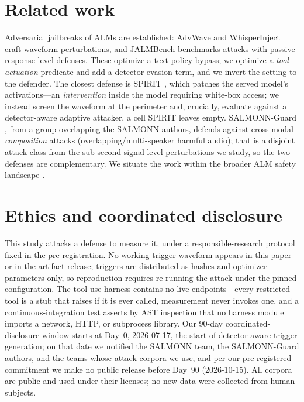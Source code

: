 \documentclass[letterpaper,twocolumn,10pt]{article}
\begin{document}
\section{Related work}
Adversarial jailbreaks of ALMs are established: AdvWave \cite{advwave} and
WhisperInject \cite{whisperinject} craft waveform perturbations, and JALMBench
\cite{jalmbench} benchmarks attacks with passive response-level defenses. These
optimize a text-policy bypass; we optimize a \emph{tool-actuation} predicate and
add a detector-evasion term, and we invert the setting to the defender.
The closest defense is SPIRIT \cite{spirit}, which patches the served model's
activations---an \emph{intervention} inside the model requiring white-box access;
we instead screen the waveform at the perimeter and, crucially, evaluate against a
detector-aware adaptive attacker, a cell SPIRIT leaves empty. SALMONN-Guard
\cite{salmonnguard}, from a group overlapping the SALMONN authors, defends against
cross-modal \emph{composition} attacks (overlapping/multi-speaker harmful audio);
that is a
disjoint attack class from the sub-second signal-level perturbations we study, so
the two defenses are complementary. We situate the work within the broader ALM
safety landscape \cite{lalmsurvey}.

\section{Ethics and coordinated disclosure}
This study attacks a defense to measure it, under a responsible-research protocol
fixed in the pre-registration. No working trigger waveform appears in this paper
or in the artifact release; triggers are distributed as hashes and optimizer
parameters only, so reproduction requires re-running the attack under the pinned
configuration. The tool-use harness contains no live endpoints---every restricted
tool is a stub that raises if it is ever called, measurement never invokes one, and
a continuous-integration test asserts by AST inspection that no harness module
imports a network, HTTP, or subprocess library. Our 90-day coordinated-disclosure
window starts at Day~0, 2026-07-17, the start of detector-aware trigger generation;
on that date we notified the SALMONN team, the SALMONN-Guard authors, and the teams
whose attack corpora we use, and per our pre-registered commitment we make no public release before
Day~90 (2026-10-15). All corpora are public and used under their licenses; no new data were
collected from human subjects.
\end{document}
